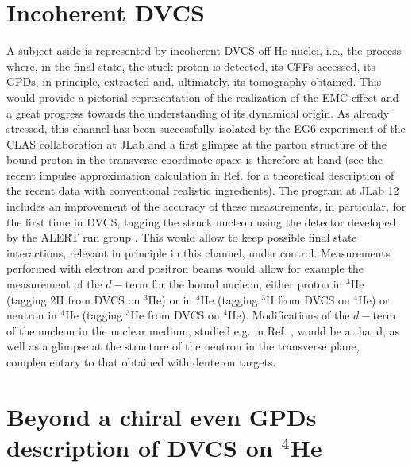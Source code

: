 \documentclass[times, twoside]{PosWhiPap}
\begin{document}
\section*{Incoherent DVCS}
{
A subject aside is represented by incoherent DVCS off He nuclei, i.e.,
the process where, in the final state, the stuck proton is detected, its CFFs accessed, its GPDs, in principle, extracted and, ultimately, its tomography obtained.
This would provide a pictorial representation of the realization of the EMC effect and a great progress towards the understanding of its dynamical origin.
As already stressed, this channel has been successfully isolated by the EG6 experiment of the CLAS collaboration at JLab \cite{Hattawy:2018liu} and a first glimpse at the parton structure of the bound proton in the transverse coordinate space is therefore at hand (see the recent impulse approximation calculation in Ref. \cite{Fucini:2019xlc} for a theoretical description
of the recent data with conventional realistic ingredients).
The program at JLab 12 includes an improvement of the accuracy of these measurements, in particular, for the first time in DVCS, tagging the struck nucleon using the detector
developed by the ALERT run group \cite{Armstrong:2017zcm}.
This would allow to keep possible final state interactions, relevant in principle in this channel, under control.
Measurements performed with 
electron and positron beams  would allow for example the measurement of the $d-$term for the bound nucleon, either proton in $^3$He (tagging 2H from DVCS on $^3$He)  or in $^4$He (tagging $^3$H from 
DVCS on $^4$He) or neutron in $^4$He (tagging $^3$He from DVCS on $^4$He). Modifications 
of the $d-$term of the nucleon in the nuclear medium, studied e.g. in
Ref.
\cite{Jung:2014jja}, would be at hand, as well as a glimpse at the structure of the neutron
in the transverse plane, complementary to that obtained with deuteron targets.}

\section*{Beyond a chiral even GPDs description of DVCS on $^4$He}
\end{document}
